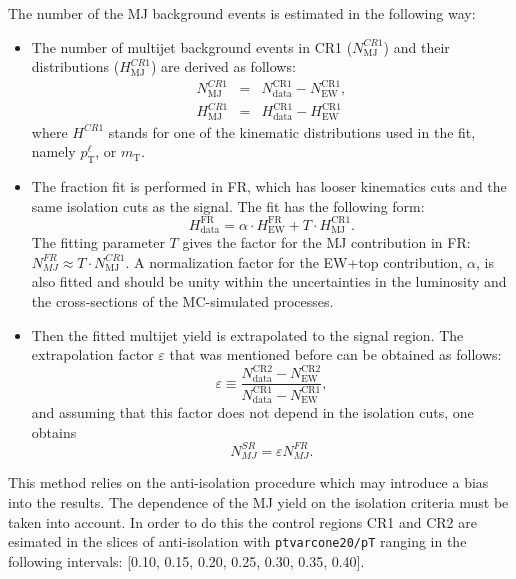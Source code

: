  The number of the MJ background events is estimated in the following way:
 \begin{itemize}
  \item The number of multijet background events in CR1 ($N_\text{MJ}^{CR1}$) and their distributions ($H_\text{MJ}^{CR1}$) are derived as follows:
 \begin{eqnarray}
 N_\text{MJ}^{CR1} &=&  N_\text{data}^\text{CR1}-N_\text{EW}^\text{CR1},\\ 
 H_\text{MJ}^{CR1} &=&  H_\text{data}^\text{CR1}-H_\text{EW}^\text{CR1} 
 \end{eqnarray}
 where $H^{CR1}$ stands for one of the kinematic distributions used in the fit, namely $p_\text{T}^\ell$, \met or $m_\text{T}$. 
 
 \item The fraction fit is performed in FR, which has looser kinematics cuts and the same isolation cuts as the signal. The fit has the following form:
 \begin{equation}
 H_\text{data}^\text{FR} = \alpha \cdot H_\text{EW}^\text{FR} + T \cdot H_\text{MJ}^\text{CR1}.
 \label{eq:mjfit1}
 \end{equation}
 The fitting parameter $T$ gives the factor for the MJ contribution in FR:  $N_{MJ}^{FR} \approx T \cdot N_\text{MJ}^{CR1}$. A normalization factor for the EW+top contribution, $\alpha$, is also fitted and should be unity within the uncertainties in the luminosity and the cross-sections of the MC-simulated processes.
 
 \item Then the fitted multijet yield is extrapolated to the signal region. The extrapolation factor $\varepsilon$ that was mentioned before can be obtained as follows:
 \begin{equation}
 \varepsilon \equiv \frac{N_\text{data}^\text{CR2}-N_\text{EW}^\text{CR2}}{N_\text{data}^\text{CR1}-N_\text{EW}^\text{CR1}},
 \label{eq:mjfit2}
 \end{equation}
 and assuming that this factor does not depend in the isolation cuts, one obtains
 \begin{equation}
 N_{MJ}^{SR} = \varepsilon N_{MJ}^{FR}.
 \end{equation}
\end{itemize}
 This method relies on the anti-isolation procedure which may introduce a bias into the results. The dependence of the MJ yield on the isolation criteria must be taken into account. In order to do this the control regions CR1 and CR2 are esimated in the slices of anti-isolation with \texttt{ptvarcone20/pT} ranging in the following intervals: [0.10, 0.15, 0.20, 0.25, 0.30, 0.35, 0.40].\\
